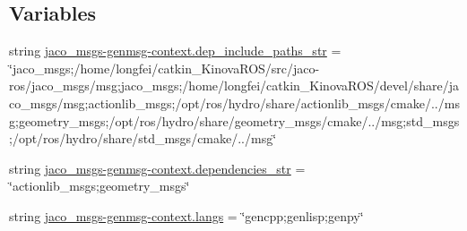 \subsection*{Variables}
\begin{DoxyCompactItemize}
\item 
string \hyperlink{namespacejaco__msgs-genmsg-context_aa136d364766642fa2a562c6fdde58cf1}{jaco\+\_\+msgs-\/genmsg-\/context.\+dep\+\_\+include\+\_\+paths\+\_\+str} = \char`\"{}jaco\+\_\+msgs;/home/longfei/catkin\+\_\+\+Kinova\+R\+OS/src/jaco-\/ros/jaco\+\_\+msgs/msg;jaco\+\_\+msgs;/home/longfei/catkin\+\_\+\+Kinova\+R\+OS/devel/share/jaco\+\_\+msgs/msg;actionlib\+\_\+msgs;/opt/ros/hydro/share/actionlib\+\_\+msgs/cmake/../msg;geometry\+\_\+msgs;/opt/ros/hydro/share/geometry\+\_\+msgs/cmake/../msg;std\+\_\+msgs;/opt/ros/hydro/share/std\+\_\+msgs/cmake/../msg\char`\"{}
\item 
string \hyperlink{namespacejaco__msgs-genmsg-context_a13566f29eee7e302ea703274056230d0}{jaco\+\_\+msgs-\/genmsg-\/context.\+dependencies\+\_\+str} = \char`\"{}actionlib\+\_\+msgs;geometry\+\_\+msgs\char`\"{}
\item 
string \hyperlink{namespacejaco__msgs-genmsg-context_a3a7105aa3a2c51a1310d64f75f399733}{jaco\+\_\+msgs-\/genmsg-\/context.\+langs} = \char`\"{}gencpp;genlisp;genpy\char`\"{}
\item 

\end{DoxyCompactItemize}
